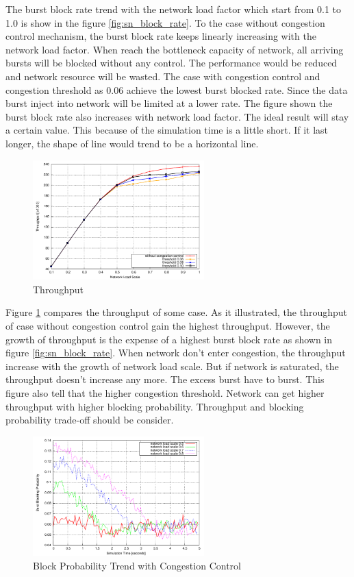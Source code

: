 The burst block rate trend with the network load factor which start from 0.1 to 1.0 is show in the figure \ref{fig:sn_block_rate}. To the case without congestion control mechanism, the burst block rate keeps linearly increasing with the network load factor. When reach the bottleneck capacity of network, all arriving bursts will be blocked without any control. The performance would be reduced and network resource will be wasted. The case with congestion control and congestion threshold as 0.06
achieve the lowest burst blocked rate. Since the data burst inject into network will be limited at a lower rate. The figure shown the burst block rate also increases with network load factor. The ideal result will stay a certain value. This because of the simulation time is a little short. If it last longer, the shape of line would trend to be a horizontal line.

\begin{figure}[!htb]
\centering
\includegraphics[width=2.6in]{result/single_node/throughput_avg}
\caption{Throughput}
\label{fig:sn_throughput}
\end{figure}

Figure \ref{fig:sn_throughput} compares the throughput of some case. As it illustrated, the throughput of case without congestion control gain the highest throughput. However, the growth of throughput is the expense of a highest burst block rate as shown in figure \ref{fig:sn_block_rate}. When network don't enter congestion, the throughput increase with the growth of network load scale. But if network is saturated, the throughput doesn't increase any more. The excess burst have to burst. This
figure also tell that the higher congestion threshold. Network can get higher throughput with higher blocking probability. Throughput and blocking probability trade-off should be consider.  

\begin{figure}[!htb]
\centering
\includegraphics[width=2.6in]{result/single_node/block_probability_trend}
\caption{Block Probability Trend with Congestion Control}
\label{fig:sn_block_probability}
\end{figure}

